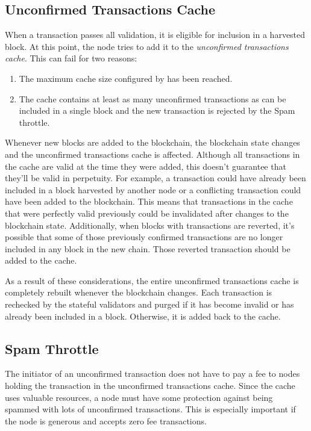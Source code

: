 \subsection{Unconfirmed Transactions Cache}

When a transaction passes all validation, it is eligible for inclusion in a harvested block.
At this point, the node tries to add it to the \emph{unconfirmed transactions cache}.
This can fail for two reasons:
\begin{enumerate}
	\item{The maximum cache size configured by  has been reached.}
	\item{The cache contains at least as many unconfirmed transactions as can be included in a single block and the new transaction is rejected by the Spam throttle}.
\end{enumerate}

Whenever new blocks are added to the blockchain, the blockchain state changes and the unconfirmed transactions cache is affected.
Although all transactions in the cache are valid at the time they were added, this doesn't guarantee that they'll be valid in perpetuity.
For example, a transaction could have already been included in a block harvested by another node or a conflicting transaction could have been added to the blockchain.
This means that transactions in the cache that were perfectly valid previously could be invalidated after changes to the blockchain state.
Additionally, when blocks with transactions are reverted, it's possible that some of those previously confirmed transactions are no longer included in any block in the new chain.
Those reverted transaction should be added to the cache.

As a result of these considerations, the entire unconfirmed transactions cache is completely rebuilt whenever the blockchain changes.
Each transaction is rechecked by the stateful validators and purged if it has become invalid or has already been included in a block.
Otherwise, it is added back to the cache.

\subsection{Spam Throttle}

The initiator of an unconfirmed transaction does not have to pay a fee to nodes holding the transaction in the unconfirmed transactions cache.
Since the cache uses valuable resources, a node must have some protection against being spammed with lots of unconfirmed transactions.
This is especially important if the node is generous and accepts zero fee transactions.


